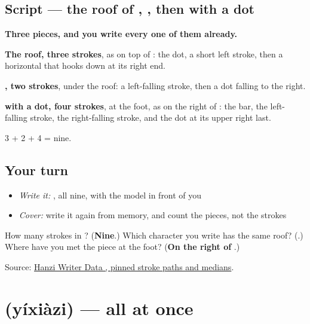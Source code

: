 \subsection*{Script — the roof of , , then  with a dot}

\begin{quote}
\end{quote}

\textbf{Three pieces, and you write every one of them already.}

\textbf{The roof, three strokes}, as on top of : the dot, a short left stroke, then a horizontal that hooks down at its right end.

\textbf{, two strokes}, under the roof: a left-falling stroke, then a dot falling to the right.

\textbf{ with a dot, four strokes}, at the foot, as on the right of : the bar, the left-falling stroke, the right-falling stroke, and the dot at its upper right last.

3 + 2 + 4 = nine.

\subsection*{Your turn}
\begin{itemize}
\raggedright
  \item \emph{Write it:} , all nine, with the model in front of you
  \item \emph{Cover:} write it again from memory, and count the pieces, not the strokes
\end{itemize}

\begin{tcolorbox}[breakable,colback=teal!4,colframe=teal!35!black,title={Before you move on}]
How many strokes in ? (\textbf{Nine}.) Which character you write has the same roof? (\textbf{}.) Where have you met the piece at the foot? (\textbf{On the right of }.)

Source: \href{https://raw.githubusercontent.com/chanind/hanzi-writer-data/68d10a4b21150cae5e1ebbd223eed289cf32d90c/data/\%E7\%AA\%81.json}{Hanzi Writer Data , pinned stroke paths and medians}.
\end{tcolorbox}
\section[\texorpdfstring{\zh{一下子} (yíxiàzi)}{一下子 (yíxiàzi)}]{ (yíxiàzi) — all at once}

